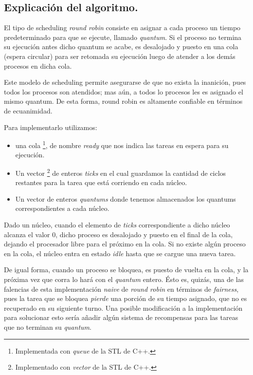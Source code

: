 \documentclass[a4paper]{article}
\begin{document}
\subsection{Explicación del algoritmo.}
El tipo de scheduling \textit{round robin} consiste en asignar a cada
proceso un tiempo predeterminado para que se ejecute, llamado
\textit{quantum}. Si el proceso no termina su ejecución antes dicho quantum
se acabe, es desalojado y puesto en una cola (espera circular) para ser
retomada su ejecución luego de atender a los demás procesos en dicha cola.

Este modelo de scheduling permite asegurarse de que no exista la inanición,
pues todos los procesos son atendidos; mas aún, a todos lo
procesos les es asignado el mismo quantum. De esta
forma, round robin es altamente confiable en términos de ecuanimidad.

Para implementarlo utilizamos:
\begin{itemize}
\item una cola \footnote{Implementada con \textit{queue} de la STL de C++.}, de nombre
\textit{ready} que nos indica las tareas en espera para su ejecución.
\item Un vector \footnote{Implementado con
\textit{vector} de la STL de C++.} de enteros \textit{ticks} en el cual
guardamos la cantidad de ciclos restantes para la tarea que está corriendo
en cada núcleo.
\item Un vector de enteros \textit{quantums} donde tenemos
almacenados los quantums correspondientes a cada núcleo. 
\end{itemize}

Dado un núcleo, cuando el elemento de \textit{ticks} correspondiente a dicho
núcleo alcanza el valor $0$, dicho proceso es desalojado y puesto en el
final de la cola, dejando el procesador libre para el próximo en la cola.
Si no existe algún proceso en la cola, el núcleo entra en estado
\textit{idle} hasta que se cargue una nueva tarea.

De igual forma, cuando un proceso se bloquea, es puesto de vuelta en la
cola, y la próxima vez que corra lo hará con el \textit{quantum} entero.
Ésto es, quizás, una de las falencias de esta implementación \textit{naive}
de \textit{round robin} en términos de \textit{fairness}, pues la tarea que
se bloquea \textit{pierde} una porción de su tiempo asignado, que no es
recuperado en su siguiente turno. Una posible modificación a la
implementación para solucionar esto sería añadir algún sistema de
recompensas para las tareas que no terminan su \textit{quantum}.
\end{document}
